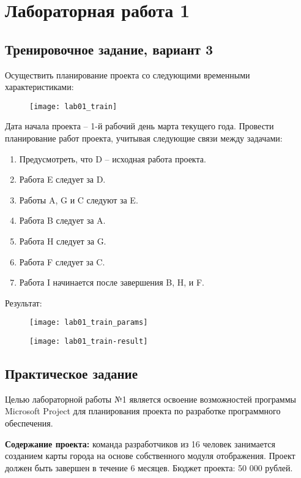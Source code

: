 \chapter{Лабораторная работа 1}
\section*{Тренировочное задание, вариант 3}

Осуществить планирование проекта со следующими временными характеристиками:

\begin{figure}[h!]
	\texttt{[image: lab01\_train]}
\end{figure}

Дата начала проекта – 1-й рабочий день марта текущего года.
Провести планирование работ проекта, учитывая следующие связи между задачами:

\begin{enumerate}
	\item Предусмотреть, что D – исходная работа проекта.
	\item Работа E следует за D.
	\item Работы A, G и C следуют за E.
	\item Работа B следует за A.
	\item Работа H следует за G.
	\item Работа F следует за C.
	\item Работа I начинается после завершения B, H, и F.
\end{enumerate}

Результат:

\begin{figure}[h!]
	\texttt{[image: lab01\_train\_params]}
\end{figure}

\begin{figure}[h!]
	\texttt{[image: lab01\_train-result]}
\end{figure}

\section*{Практическое задание}

Целью лабораторной работы №1 является освоение возможностей программы Microsoft Project для планирования проекта по разработке программного обеспечения.

\textbf{Содержание проекта:} команда разработчиков из 16 человек занимается созданием карты города на основе собственного модуля отображения. Проект должен быть завершен в течение 6 месяцев. Бюджет проекта: 50 000 рублей.


